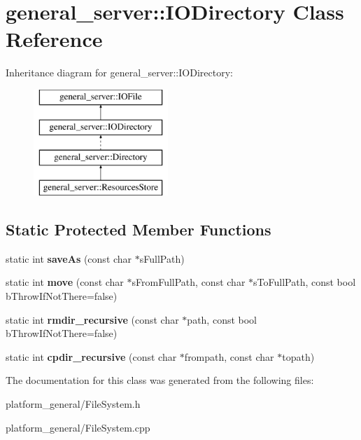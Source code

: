 \hypertarget{classgeneral__server_1_1IODirectory}{\section{general\-\_\-server\-:\-:\-I\-O\-Directory \-Class \-Reference}
\label{classgeneral__server_1_1IODirectory}
}
\-Inheritance diagram for general\-\_\-server\-:\-:\-I\-O\-Directory\-:\begin{figure}[H]
\begin{center}
\leavevmode
\includegraphics[height=4.000000cm]{classgeneral__server_1_1IODirectory}
\end{center}
\end{figure}
\subsection*{\-Static \-Protected \-Member \-Functions}
\begin{DoxyCompactItemize}
\item 
\hypertarget{classgeneral__server_1_1IODirectory_adc691ca48657684c30f9c2dcc3b28e04}{static int {\bfseries save\-As} (const char $\ast$s\-Full\-Path)}\label{classgeneral__server_1_1IODirectory_adc691ca48657684c30f9c2dcc3b28e04}

\item 
\hypertarget{classgeneral__server_1_1IODirectory_a30aa67775f97d1b5c622c47b86af1c31}{static int {\bfseries move} (const char $\ast$s\-From\-Full\-Path, const char $\ast$s\-To\-Full\-Path, const bool b\-Throw\-If\-Not\-There=false)}\label{classgeneral__server_1_1IODirectory_a30aa67775f97d1b5c622c47b86af1c31}

\item 
\hypertarget{classgeneral__server_1_1IODirectory_a60cf93a209da501e0f925f8eaf7a899f}{static int {\bfseries rmdir\-\_\-recursive} (const char $\ast$path, const bool b\-Throw\-If\-Not\-There=false)}\label{classgeneral__server_1_1IODirectory_a60cf93a209da501e0f925f8eaf7a899f}

\item 
\hypertarget{classgeneral__server_1_1IODirectory_a63e366a35fd0eca00475223e4f512f69}{static int {\bfseries cpdir\-\_\-recursive} (const char $\ast$frompath, const char $\ast$topath)}\label{classgeneral__server_1_1IODirectory_a63e366a35fd0eca00475223e4f512f69}

\end{DoxyCompactItemize}


\-The documentation for this class was generated from the following files\-:\begin{DoxyCompactItemize}
\item 
platform\-\_\-general/\-File\-System.\-h\item 
platform\-\_\-general/\-File\-System.\-cpp\end{DoxyCompactItemize}
